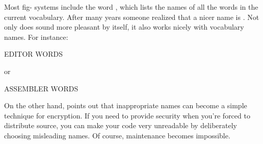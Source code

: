 Most fig-\Forth{} systems include the word , which lists
the names of all the words in the current vocabulary.  After many
years someone realized that a nicer name is .  Not only
does  sound more pleasant by itself, it also works nicely
with vocabulary names.  For instance:
\begin{Code}
EDITOR WORDS
\end{Code}
or
\begin{Code}
ASSEMBLER WORDS
\end{Code}
On the other hand,  points out
that inappropriate names can become a simple technique for encryption.%
If you need to provide security when you're forced to distribute
source, you can make your code very unreadable by deliberately
choosing misleading names.  Of course, maintenance becomes impossible.


